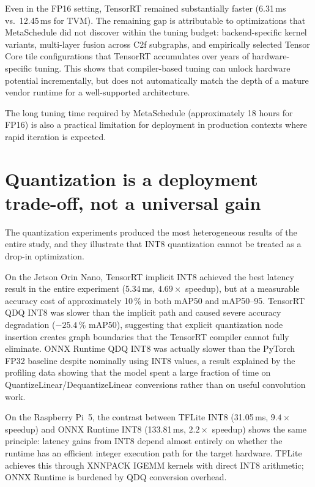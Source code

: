\documentclass[12pt,a4paper]{report}
\begin{document}
Even in the FP16 setting, TensorRT remained substantially faster (6.31\,ms vs.\ 12.45\,ms for TVM).
The remaining gap is attributable to optimizations that MetaSchedule did not discover within the tuning budget:
backend-specific kernel variants, multi-layer fusion across C2f subgraphs, and empirically selected Tensor Core tile
configurations that TensorRT accumulates over years of hardware-specific tuning.
This shows that compiler-based tuning can unlock hardware potential incrementally, but does not automatically match the
depth of a mature vendor runtime for a well-supported architecture.

The long tuning time required by MetaSchedule (approximately 18 hours for FP16) is also a practical limitation for
deployment in production contexts where rapid iteration is expected.

\section{Quantization is a deployment trade-off, not a universal gain}

The quantization experiments produced the most heterogeneous results of the entire study, and they illustrate that
INT8 quantization cannot be treated as a drop-in optimization.

On the Jetson Orin Nano, TensorRT implicit INT8 achieved the best latency result in the entire experiment (5.34\,ms,
$4.69\times$ speedup), but at a measurable accuracy cost of approximately 10\,\% in both mAP50 and mAP50--95.
TensorRT QDQ INT8 was slower than the implicit path and caused severe accuracy degradation ($-25.4\,\%$ mAP50),
suggesting that explicit quantization node insertion creates graph boundaries that the TensorRT compiler cannot
fully eliminate.
ONNX Runtime QDQ INT8 was actually slower than the PyTorch FP32 baseline despite nominally using INT8 values, a
result explained by the profiling data showing that the model spent a large fraction of time on
QuantizeLinear/DequantizeLinear conversions rather than on useful convolution work.

On the Raspberry Pi~5, the contrast between TFLite INT8 (31.05\,ms, $9.4\times$ speedup) and ONNX Runtime INT8
(133.81\,ms, $2.2\times$ speedup) shows the same principle: latency gains from INT8 depend almost entirely on whether
the runtime has an efficient integer execution path for the target hardware.
TFLite achieves this through XNNPACK IGEMM kernels with direct INT8 arithmetic; ONNX Runtime is burdened by QDQ
conversion overhead.
\end{document}
